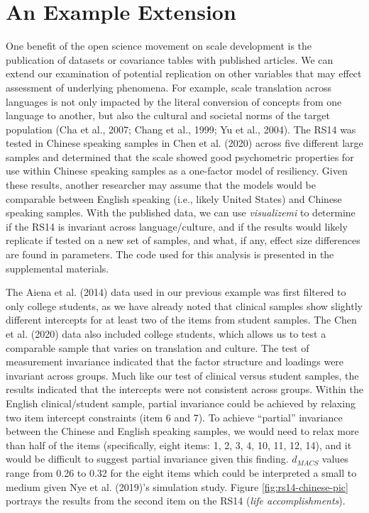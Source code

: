 \documentclass[
  man]{apa7}
\begin{document}
\section{An Example Extension}\label{an-example-extension}

One benefit of the open science movement on scale development is the publication of datasets or covariance tables with published articles. We can extend our examination of potential replication on other variables that may effect assessment of underlying phenomena. For example, scale translation across languages is not only impacted by the literal conversion of concepts from one language to another, but also the cultural and societal norms of the target population (Cha et al., 2007; Chang et al., 1999; Yu et al., 2004). The RS14 was tested in Chinese speaking samples in Chen et al. (2020) across five different large samples and determined that the scale showed good psychometric properties for use within Chinese speaking samples as a one-factor model of resiliency. Given these results, another researcher may assume that the models would be comparable between English speaking (i.e., likely United States) and Chinese speaking samples. With the published data, we can use \emph{visualizemi} to determine if the RS14 is invariant across language/culture, and if the results would likely replicate if tested on a new set of samples, and what, if any, effect size differences are found in parameters. The code used for this analysis is presented in the supplemental materials.

The Aiena et al. (2014) data used in our previous example was first filtered to only college students, as we have already noted that clinical samples show slightly different intercepts for at least two of the items from student samples. The Chen et al. (2020) data also included college students, which allows us to test a comparable sample that varies on translation and culture. The test of measurement invariance indicated that the factor structure and loadings were invariant across groups. Much like our test of clinical versus student samples, the results indicated that the intercepts were not consistent across groups. Within the English clinical/student sample, partial invariance could be achieved by relaxing two item intercept constraints (item 6 and 7). To achieve ``partial'' invariance between the Chinese and English speaking samples, we would need to relax more than half of the items (specifically, eight items: 1, 2, 3, 4, 10, 11, 12, 14), and it would be difficult to suggest partial invariance given this finding. \(d_{MACS}\) values range from 0.26 to 0.32 for the eight items which could be interpreted a small to medium given Nye et al. (2019)'s simulation study. Figure \ref{fig:rs14-chinese-pic} portrays the results from the second item on the RS14 (\emph{life accomplishments}).
\end{document}
